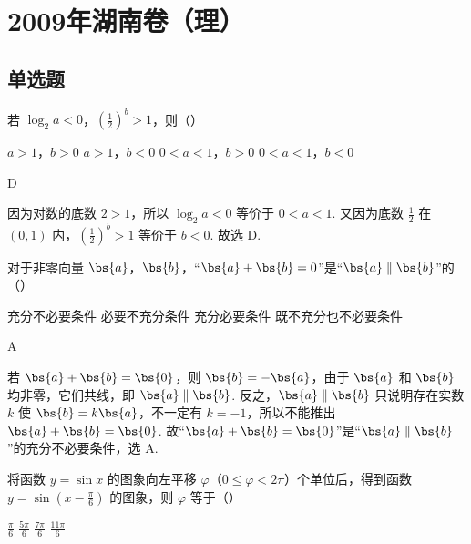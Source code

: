 \chapter{2009年湖南卷（理）}

\section{单选题}

\begin{problem}
若 \(\log_{2} a < 0\)，\(\left(\frac{1}{2}\right)^b > 1\)，则（\quad）

\choices
    {\(a > 1\)，\(b > 0\)}
    {\(a > 1\)，\(b < 0\)}
    {\(0 < a < 1\)，\(b > 0\)}
    {\(0 < a < 1\)，\(b < 0\)}
\end{problem}

\begin{answer}
D
\end{answer}

\begin{solution}
因为对数的底数 \(2>1\)，所以 \(\log_{2}a<0\) 等价于 \(0<a<1\). 又因为底数 \(\frac{1}{2}\) 在 \((0,1)\) 内，\(\left(\frac{1}{2}\right)^b>1\) 等价于 \(b<0\). 故选 D.
\end{solution}

\begin{problem}
对于非零向量 \(\bs{a}\)，\(\bs{b}\)，“\(\bs{a} + \bs{b} = 0\)”是“\(\bs{a} \parallel \bs{b}\)”的（\quad）

\choices
    {充分不必要条件}
    {必要不充分条件}
    {充分必要条件}
    {既不充分也不必要条件}
\end{problem}

\begin{answer}
A
\end{answer}

\begin{solution}
若 \(\bs{a}+\bs{b}=\bs{0}\)，则 \(\bs{b}=-\bs{a}\)，由于 \(\bs{a}\) 和 \(\bs{b}\) 均非零，它们共线，即 \(\bs{a}\parallel\bs{b}\). 反之，\(\bs{a}\parallel\bs{b}\) 只说明存在实数 \(k\) 使 \(\bs{b}=k\bs{a}\)，不一定有 \(k=-1\)，所以不能推出 \(\bs{a}+\bs{b}=\bs{0}\). 故“\(\bs{a}+\bs{b}=\bs{0}\)”是“\(\bs{a}\parallel\bs{b}\)”的充分不必要条件，选 A.
\end{solution}

\begin{problem}
将函数 \( y = \sin x \) 的图象向左平移 \( \varphi \)（\(0 \leqslant \varphi < 2\pi\)）个单位后，得到函数 \( y = \sin \left(x - \frac{\pi}{6}\right) \) 的图象，则 \( \varphi \) 等于（\quad）

\choices
    {\( \frac{\pi}{6} \)}
    {\( \frac{5\pi}{6} \)}
    {\( \frac{7\pi}{6} \)}
    {\( \frac{11\pi}{6} \)}
\end{problem}

